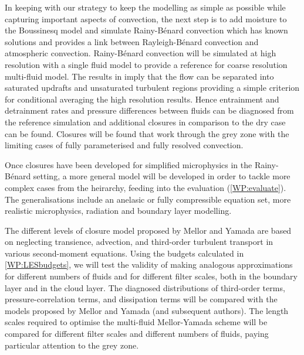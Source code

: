 \documentclass[11pt,a4paper]{article}
\begin{document}

In keeping with our strategy to keep the modelling as simple as possible while capturing important aspects of convection, the next step is to add moisture to the Boussinesq model and simulate Rainy-B\'enard convection \cite[]{WPS10,VPT19} which has known solutions and provides a link between Rayleigh-B\'enard convection and atmospheric convection. Rainy-B\'enard convection will be simulated at high resolution with a single fluid model to provide a reference for coarse resolution multi-fluid model. The results in \cite{VPT19} imply that the flow can be separated into saturated updrafts and unsaturated turbulent regions providing a simple criterion for conditional averaging the high resolution results. Hence entrainment and detrainment rates and pressure differences between fluids can be diagnosed from the reference simulation and additional closures in comparison to the dry case can be found. Closures will be found that work through the grey zone with the limiting cases of fully parameterised and fully resolved convection.

Once closures have been developed for simplified microphysics in the Rainy-B\'enard setting, a more general model will be developed in order to tackle more complex cases from the heirarchy, feeding into the evaluation (\ref{WP:evaluate}). The generalisations include an anelasic or fully compressible equation set, more realistic microphysics, radiation and boundary layer modelling.


The different levels of closure model proposed by Mellor and Yamada are based on neglecting transience, advection, and third-order turbulent transport in various second-moment equations. Using the budgets calculated in \ref{WP:LESbudgets}, we will test the validity of making analogous approximations for different numbers of fluids and for different filter scales, both in the boundary layer and in the cloud layer. The diagnosed distributions of third-order terms, pressure-correlation terms, and dissipation terms will be compared with the models proposed by Mellor and Yamada (and subsequent authors). The length scales required to optimise the multi-fluid Mellor-Yamada scheme will be compared for different filter scales and different numbers of fluids, paying particular attention to the grey zone. 
\end{document}
